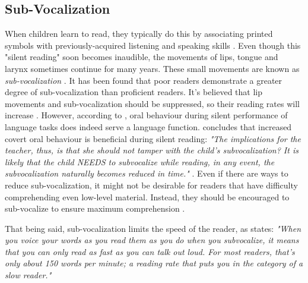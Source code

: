 \subsection{Sub-Vocalization}
When children learn to read, they typically do this by associating printed symbols with previously-acquired listening and speaking skills \cite{bruinsma_should_1980}. Even though this "silent reading" soon becomes inaudible, the movements of lips, tongue and larynx sometimes continue for many years. These small movements are known as \textit{sub-vocalization} \cite{bruinsma_should_1980}. It has been found that poor readers demonstrate a greater degree of sub-vocalization than proficient readers. It's believed that lip movements and sub-vocalization should be suppressed, so their reading rates will increase \cite{bruinsma_should_1980}. However, according to , oral behaviour during silent performance of language tasks does indeed serve a language function. \citeauthor{j_covert_1970} concludes that increased covert oral behaviour is beneficial during silent reading: \emph{"The implications for the teacher, thus, is that she should not tamper with the child's subvocalization? It is likely that the child NEEDS to subvocalize while reading, in any event, the subvocalization naturally becomes reduced in time."} \cite{bruinsma_should_1980}. Even if there are ways to reduce sub-vocalization, it might not be desirable for readers that have difficulty comprehending even low-level material. Instead, they should be encouraged to sub-vocalize to ensure maximum comprehension \cite{bruinsma_should_1980}.

That being said, sub-vocalization limits the speed of the reader, as  states: \emph{"When you voice your words as you read them as you do when you subvocalize, it means that you can only read as fast as you can talk out loud.  For most readers, that's only about 150 words per minute; a reading rate that puts you in the category of a slow reader."}

